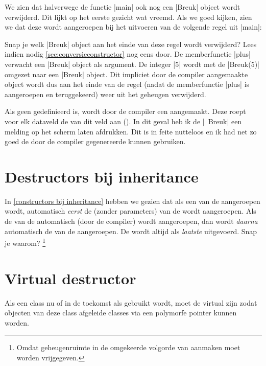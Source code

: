 \begin{cpplstShortInline}
We zien dat halverwege de functie |main| ook nog een |Breuk| object wordt verwijderd. 
Dit lijkt op het eerste gezicht wat vreemd.
Als we goed kijken, zien we dat deze  wordt aangeroepen bij het uitvoeren van de volgende regel uit |main|:

Snap je welk |Breuk| object aan het einde van deze regel wordt verwijderd? 
Lees indien nodig \cref{sec:conversieconstructor} nog eens door.
De memberfunctie |plus| verwacht een |Breuk| object als argument.
De integer |5| wordt met de  |Breuk(5)| omgezet naar een |Breuk| object.
Dit impliciet door de compiler aangemaakte object wordt dus aan het einde van de regel (nadat de memberfunctie |plus| is aangeroepen en teruggekeerd) weer uit het geheugen verwijderd.

\label{default destructor}
Als geen  gedefinieerd is, wordt door de compiler een \emph{} aangemaakt.
Deze  roept voor elk dataveld de  van dit veld aan (\emph{}).
In dit geval heb ik de  |~Breuk| een melding op het scherm laten afdrukken.
Dit is in feite nutteloos en ik had net zo goed de door de compiler gegenereerde  kunnen gebruiken.

\section{Destructors bij inheritance}
\label{destructor bij inheritance}
In \cref{constructors bij inheritance} hebben we gezien dat als een  van de  aangeroepen wordt, automatisch \emph{eerst} de  (zonder parameters) van de  wordt aangeroepen.
Als de  van de  automatisch (door de compiler) wordt aangeroepen, dan wordt \emph{daarna} automatisch de  van de  aangeroepen.
De  wordt altijd als \emph{laatste} uitgevoerd.
Snap je waarom?%
\footnote{%
    Omdat geheugenruimte in de omgekeerde volgorde van aanmaken moet worden vrijgegeven.
}

\section{Virtual destructor}
\label{sec:virtualdestructor} 
Als een class nu of in de toekomst als  gebruikt wordt, moet de  virtual zijn zodat objecten van deze class afgeleide classes via een polymorfe pointer  kunnen worden.


\end{cpplstShortInline}
